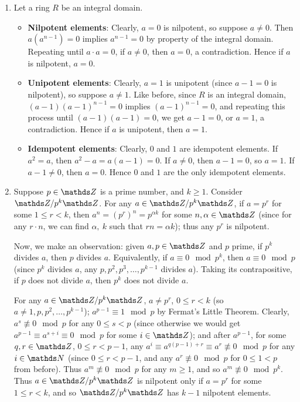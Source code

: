 \documentclass{homework}
\begin{document}
\begin{solution}
  \begin{enumerate}[label=(\alph*)]
    \item Let a ring $R$ be an integral domain.
      \begin{itemize}
        \item \textbf{Nilpotent elements}: Clearly, $a=0$ is nilpotent, so suppose $a\neq 0$.
      Then $a(a^{n-1})=0$ implies $a^{n-1}=0$ by property of the integral domain. Repeating until
      $a\cdot a=0$, if $a\neq 0$, then $a=0$, a contradiction. Hence if $a$ is nilpotent, $a=0$.

        \item \textbf{Unipotent elements}: Clearly, $a=1$ is unipotent (since $a-1=0$ is nilpotent),
          so suppose $a\neq 1$. Like before, since $R$ is an integral domain, $(a-1)(a-1)^{n-1}=0$
          implies $(a-1)^{n-1}=0$, and repeating this process until $(a-1)(a-1)=0$, we get $a-1=0$,
          or $a=1$, a contradiction. Hence if $a$ is unipotent, then $a=1$.

        \item \textbf{Idempotent elements}: Clearly, $0$ and $1$ are idempotent elements. If
          $a^2=a$, then $a^2-a=a(a-1)=0$. If $a\neq 0$, then $a-1=0$, so $a=1$. If $a-1\neq 0$, then
          $a=0$. Hence $0$ and $1$ are the only idempotent elements.
      \end{itemize}

    \item Suppose $p\in \Z$ is a prime number, and $k\ge 1$. Consider $\Z / p^k\Z$. For any $a\in \Z
      / p^k \Z$, if $a=p^r$ for some $1\le r<k$, then $a^n=(p^r)^n=p^{\alpha k}$ for some
      $n,\alpha\in \Z$ (since for any $r\cdot n$, we can find $ \alpha,\ k$ such that $rn=\alpha
      k$); thus any $p^r$ is nilpotent.

      Now, we make an observation: given $a,p\in \Z$ and $p$ prime, if $p^k$ divides $a$, then $p$ 
      divides $a$. Equivalently, if $a\equiv 0\mod{p^k}$, then $a\equiv 0\mod{p}$ (since $p^k$
      divides $a$, any $p,p^2,p^3,\ldots,p^{k-1}$ divides $a$). Taking its contrapositive, if $p$
      does not divide $a$, then $p^k$ does not divide $a$.

      For any $a\in \Z / p^k\Z$, $a\neq p^r$, $0\le r<k$ (so $a\neq 1,p,p^2,\ldots,p^{k-1}$);
      $a^{p-1}\equiv 1\mod{p}$ by Fermat's Little Theorem. Clearly, $a^s\not\equiv 0\mod{p}$ for any
      $0\le s < p$ (since otherwise we would get $a^{p-1}\equiv a^{s+i}\equiv 0\mod{p}$ for some
      $i\in \Z$); and after $a^{p-1}$, for some $q,r\in \Z$, $0\le r<p-1$, any $a^i\equiv
      a^{q(p-1)+r}\equiv a^r\not\equiv 0\mod{p}$ for any $i\in \N$ (since $0\le r<p-1$, and any
      $a^r\not\equiv 0\mod{p}$ for $0\le 1<p$ from before). Thus $a^m\not\equiv 0\mod{p}$ for any
      $m\ge 1$, and so $a^m\not\equiv 0\mod{p^k}$. Thus $a\in \Z / p^k \Z$ is nilpotent only if
      $a=p^r$ for some $1\le r<k$, and so $\Z / p^k\Z$ has $k-1$ nilpotent elements.


\end{enumerate}
\end{solution}
\end{document}
